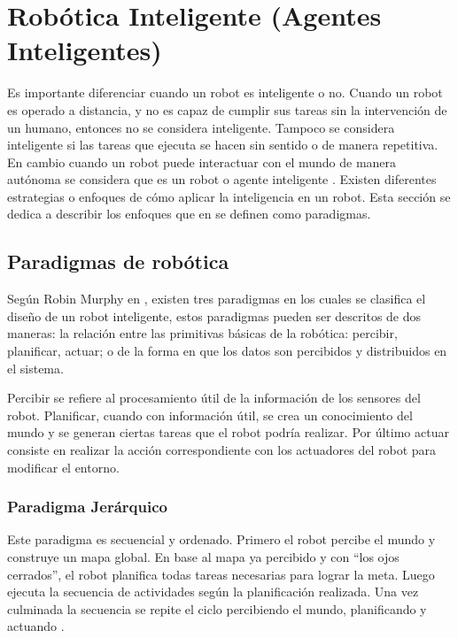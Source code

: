 \section{Robótica Inteligente (Agentes Inteligentes)} \label{sect:AgentesInteligentes}

Es importante diferenciar cuando un robot es inteligente o no. Cuando un robot es operado a distancia, y no es capaz de cumplir sus tareas sin la intervención de un humano, entonces no se considera  inteligente. Tampoco se considera inteligente si las tareas que ejecuta se hacen sin sentido o de manera repetitiva. En cambio cuando un robot puede interactuar con el mundo de manera autónoma se considera que es un robot o agente inteligente \cite{AiRobotics}. Existen diferentes estrategias o enfoques de cómo aplicar la inteligencia en un robot. Esta sección se dedica a describir los enfoques que en  \cite{AiRobotics} se definen como paradigmas.   
   
\subsection{Paradigmas de robótica}
Según Robin Murphy en \cite{AiRobotics}, existen tres paradigmas en los cuales se clasifica el diseño de un robot inteligente, estos paradigmas pueden ser descritos de dos maneras: la relación entre las primitivas básicas de la robótica:  percibir, planificar, actuar; o de la forma en que los datos son percibidos y distribuidos en el sistema.

Percibir se refiere al procesamiento útil de la información de los sensores del robot. Planificar, cuando con información útil, se crea un conocimiento del mundo y se generan ciertas tareas que el robot podría realizar. Por último actuar consiste en realizar la acción correspondiente con los actuadores del robot para modificar el entorno. 

\subsubsection{Paradigma Jerárquico}

Este paradigma es secuencial y ordenado. Primero el robot percibe el mundo y construye un mapa global. En base al mapa ya percibido y con “los ojos cerrados”, el robot planifica todas tareas necesarias para lograr la meta. Luego ejecuta la secuencia de actividades según la planificación realizada. Una vez culminada la secuencia se repite el ciclo percibiendo el mundo, planificando y actuando \cite{AiRobotics}.

